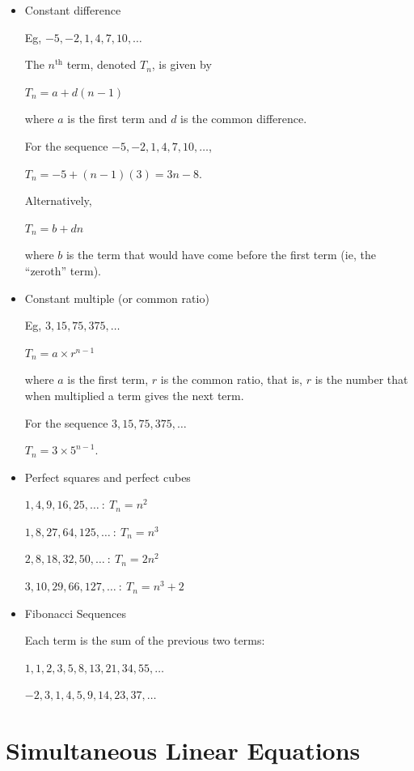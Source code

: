\documentclass[twocolumn]{article}
\begin{document}
\begin{itemize}  
	
\item Constant difference

Eg, $-5, -2, 1, 4, 7, 10, \ldots$

The $n^{\text{th}}$ term, denoted $T_n$, is given by

$T_n = a + d(n-1)$

where $a$ is the first term and $d$ is the common difference.

For the sequence $-5, -2, 1, 4, 7, 10, \ldots$, 

$T_n = -5 + (n-1)(3) = 3n - 8$.

Alternatively,

$T_n = b + dn$

where $b$ is the term that would have come before the first term (ie, the ``zeroth'' term).

\item Constant multiple (or common ratio)

Eg, $3, 15, 75, 375, \ldots$

$T_n = a \times r^{n-1}$

where $a$ is the first term, $r$ is the common ratio, that is, $r$ is the number that when multiplied a term gives the next term.

For the sequence $3, 15, 75, 375, \ldots$

$T_n = 3 \times 5^{n-1}$.

\item Perfect squares and perfect cubes

$1, 4, 9, 16, 25, \ldots \ : \ T_n = n^2$

$1, 8, 27, 64, 125, \ldots \ : \ T_n = n^3$

$2, 8, 18, 32, 50, \ldots \ : \ T_n = 2n^2$

$3, 10, 29, 66, 127, \ldots \ : \ T_n = n^3+2$

\item Fibonacci Sequences

Each term is the sum of the previous two terms:

$1, 1, 2, 3, 5, 8, 13, 21, 34, 55, \ldots$

$-2, 3, 1, 4, 5, 9, 14, 23, 37, \ldots$
	
\end{itemize}  	

\section*{Simultaneous Linear Equations}
\end{document}

